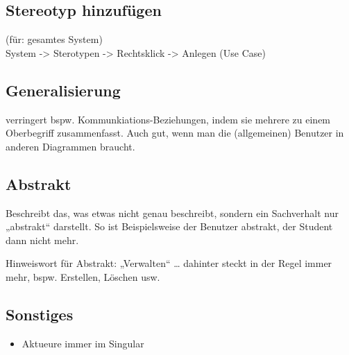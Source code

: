 \subsection{Stereotyp hinzufügen}
(für: gesamtes System)\\
System -> Sterotypen -> Rechtsklick -> Anlegen (Use Case)

\subsection{Generalisierung}
verringert bspw. Kommunkiations-Beziehungen, indem sie mehrere zu einem Oberbegriff zusammenfasst. Auch gut, wenn man die (allgemeinen) Benutzer in anderen Diagrammen braucht.

\subsection{Abstrakt}
Beschreibt das, was etwas nicht genau beschreibt, sondern ein Sachverhalt nur „abstrakt“ darstellt. So ist Beispielsweise der Benutzer abstrakt, der Student dann nicht mehr.

Hinweiswort für Abstrakt: „Verwalten“ … dahinter steckt in der Regel immer mehr, bspw. Erstellen, Löschen usw.
\subsection{Sonstiges}
\begin{itemize}
\item Aktueure immer im Singular
\end{itemize}

